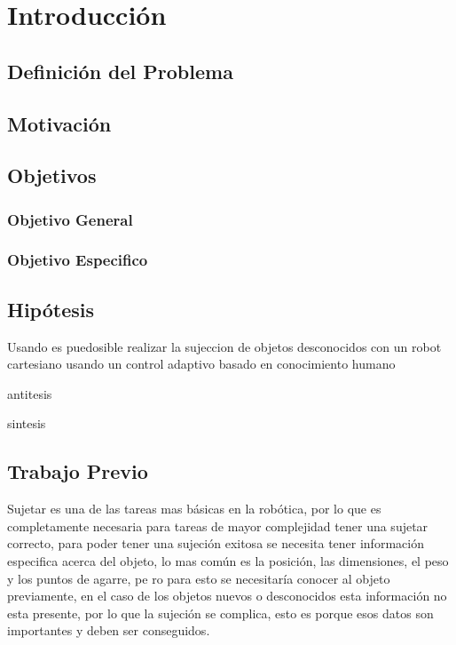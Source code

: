\chapter{Introducción}\label{intro}

\section{Definición del Problema}

\section{Motivación}

\section{Objetivos}

\subsection{Objetivo General}

\subsection{Objetivo Especifico}

\section{Hipótesis}
Usando 
es puedosible realizar la sujeccion de objetos desconocidos con un robot cartesiano usando un control adaptivo basado en conocimiento humano

antitesis


sintesis

\section{Trabajo Previo}
Sujetar es una de las tareas mas básicas en la robótica, por lo que es completamente necesaria para tareas de mayor complejidad tener una sujetar correcto, para poder tener una sujeción exitosa se necesita tener información especifica acerca del objeto, lo mas común es la posición, las dimensiones, el peso y los puntos de agarre, pe
ro para esto se necesitaría conocer al objeto previamente, en el caso de los objetos nuevos o desconocidos esta información no esta presente, por lo que la sujeción se complica, esto es porque esos datos son importantes y deben ser conseguidos.


